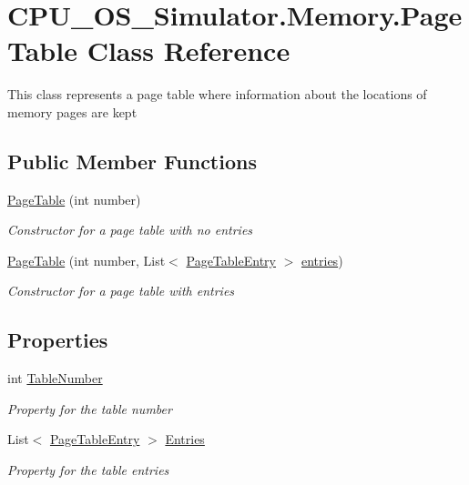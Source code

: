 \hypertarget{class_c_p_u___o_s___simulator_1_1_memory_1_1_page_table}{}\section{C\+P\+U\+\_\+\+O\+S\+\_\+\+Simulator.\+Memory.\+Page\+Table Class Reference}
\label{class_c_p_u___o_s___simulator_1_1_memory_1_1_page_table}


This class represents a page table where information about the locations of memory pages are kept  


\subsection*{Public Member Functions}
\begin{DoxyCompactItemize}
\item 
\hyperlink{class_c_p_u___o_s___simulator_1_1_memory_1_1_page_table_a82e8026d70d5bd7cd7376d8af809952a}{Page\+Table} (int number)
\begin{DoxyCompactList}\small\item\em Constructor for a page table with no entries \end{DoxyCompactList}\item 
\hyperlink{class_c_p_u___o_s___simulator_1_1_memory_1_1_page_table_a29c9c3d340af4ab70e642399027301e5}{Page\+Table} (int number, List$<$ \hyperlink{class_c_p_u___o_s___simulator_1_1_memory_1_1_page_table_entry}{Page\+Table\+Entry} $>$ \hyperlink{class_c_p_u___o_s___simulator_1_1_memory_1_1_page_table_afaec11faaccf2f772fa8d5c52cfcf9ad}{entries})
\begin{DoxyCompactList}\small\item\em Constructor for a page table with entries \end{DoxyCompactList}\end{DoxyCompactItemize}
\subsection*{Properties}
\begin{DoxyCompactItemize}
\item 
int \hyperlink{class_c_p_u___o_s___simulator_1_1_memory_1_1_page_table_a7a30b834bfe4da78dcaa6276b4572c93}{Table\+Number}
\begin{DoxyCompactList}\small\item\em Property for the table number \end{DoxyCompactList}\item 
List$<$ \hyperlink{class_c_p_u___o_s___simulator_1_1_memory_1_1_page_table_entry}{Page\+Table\+Entry} $>$ \hyperlink{class_c_p_u___o_s___simulator_1_1_memory_1_1_page_table_a39686465a9c618e73a0a2d8f316ffa2c}{Entries}
\begin{DoxyCompactList}\small\item\em Property for the table entries \end{DoxyCompactList}\end{DoxyCompactItemize}
